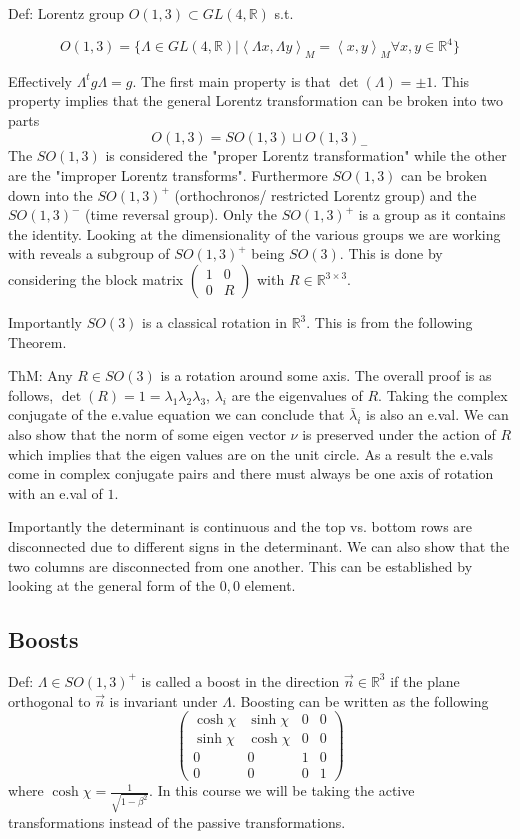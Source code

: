 Def: Lorentz group $O(1, 3) \subset GL(4, \mathbb{R})$ s.t.

$$
  O(1, 3) = \{ \Lambda \in GL(4, \mathbb{R}) \vert
  \left<\Lambda x, \Lambda y\right>_M = \left<x, y\right>_M \forall x, y \in \mathbb{R}^4\}  
$$

Effectively $\Lambda^t g \Lambda = g$. The first main property is that
$\det \left(\Lambda\right) = \pm 1$. This property implies that the general Lorentz transformation
can be broken into two parts
$$
    O(1, 3) = SO(1, 3) \sqcup O(1, 3)_{-}
$$
The $SO(1, 3)$ is considered the "proper Lorentz transformation" while the other
are the "improper Lorentz transforms". Furthermore $SO(1, 3)$ can be broken down
into the $SO(1, 3)^{+}$ (orthochronos/ restricted Lorentz group) and the 
$SO(1, 3)^{-}$ (time reversal group). Only the $SO(1, 3)^{+}$ is a group as it contains
the identity. Looking at the dimensionality of the various groups we are working with
reveals a subgroup of $SO(1, 3)^{+}$ being $SO(3)$. This is done by considering the block
matrix $\begin{pmatrix} 1 & 0 \\0 & R \end{pmatrix}$ with $R \in \mathbb{R}^{3 \times 3}$.

Importantly $SO(3)$ is a classical rotation in $\mathbb{R}^3$. This is from the following
Theorem.

ThM: Any $R \in SO(3)$ is a rotation around some axis. The overall proof is as follows,
$\det (R) = 1 = \lambda_1 \lambda_2 \lambda_3$, $\lambda_i$ are the eigenvalues of $R$.
Taking the complex conjugate of the e.value equation we can conclude that
$\bar{\lambda}_i$ is also an e.val. We can also show that the norm of some eigen vector
$\nu$ is preserved under the action of $R$ which implies that the eigen values are on the
unit circle. As a result the e.vals come in complex conjugate pairs and there must always be
one axis of rotation with an e.val of $1$. 

Importantly the determinant is continuous and the top vs. bottom rows are disconnected due
to different signs in the determinant. We can also show that the two columns are disconnected
from one another.
This can be established by looking at the general form
of the $0, 0$ element. 

\subsection{Boosts}
Def: $\Lambda \in SO(1, 3)^{+}$ is called a boost in the direction
$\vec{n} \in \mathbb{R}^3$ if the plane orthogonal to $\vec{n}$ is invariant
under $\Lambda$. Boosting can be written as the following
$$
\begin{pmatrix}
    \cosh \chi & \sinh \chi & 0 & 0 \\
    \sinh \chi & \cosh \chi & 0 & 0 \\
    0 & 0 & 1 & 0 \\
    0 & 0 & 0 & 1
\end{pmatrix}
$$
where $\cosh \chi = \frac{1}{\sqrt{1 - \beta^2}}$. In this course we will be taking the 
active transformations instead of the passive transformations. 
